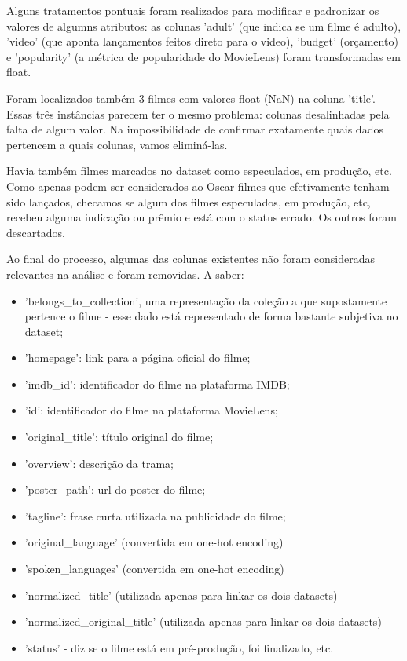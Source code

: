         Alguns tratamentos pontuais foram realizados para modificar e padronizar os valores de algumns atributos: as colunas 'adult' (que indica se um filme é adulto), 'video' (que aponta lançamentos feitos direto para o video), 'budget' (orçamento) e 'popularity' (a métrica de popularidade do MovieLens) foram transformadas em float.
        
        Foram localizados também 3 filmes com valores float (NaN) na coluna 'title'. Essas três instâncias parecem ter o mesmo problema: colunas desalinhadas pela falta de algum valor. Na impossibilidade de confirmar exatamente quais dados pertencem a quais colunas, vamos eliminá-las.
        
        Havia também filmes marcados no dataset como especulados, em produção, etc. Como apenas podem ser considerados ao Oscar filmes que efetivamente tenham sido lançados, checamos se algum dos filmes especulados, em produção, etc, recebeu alguma indicação ou prêmio e está com o status errado. Os outros foram descartados.
        
        Ao final do processo, algumas das colunas existentes não foram consideradas relevantes na análise e foram removidas. A saber:

        \begin{itemize}
            \item 'belongs\_to\_collection', uma representação da coleção a que supostamente pertence o filme - esse dado está representado de forma bastante subjetiva no dataset;
            \item 'homepage': link para a página oficial do filme;
            \item 'imdb\_id': identificador do filme na plataforma IMDB;
            \item 'id': identificador do filme na plataforma MovieLens;
            \item 'original\_title': título original do filme;
            \item 'overview': descrição da trama;
            \item 'poster\_path': url do poster do filme;
            \item 'tagline': frase curta utilizada na publicidade do filme;
            \item 'original\_language' (convertida em one-hot encoding)
            \item 'spoken\_languages' (convertida em one-hot encoding)
            \item 'normalized\_title' (utilizada apenas para linkar os dois datasets)
            \item 'normalized\_original\_title' (utilizada apenas para linkar os dois datasets)
            \item 'status' - diz se o filme está em pré-produção, foi finalizado, etc.
        \end{itemize}

